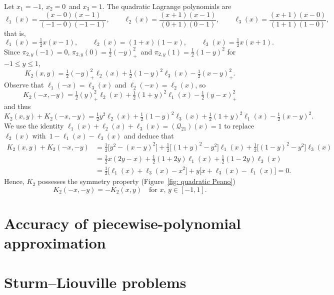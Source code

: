 \begin{example}\label{example: quadratic interp}
Let $x_1=-1$, $x_2=0$~and $x_3=1$.  The quadratic Lagrange polynomials are
\[
\ell_1(x)=\frac{(x-0)(x-1)}{(-1-0)(-1-1)},\qquad
\ell_2(x)=\frac{(x+1)(x-1)}{(0+1)(0-1)},\qquad
\ell_3(x)=\frac{(x+1)(x-0)}{(1+1)(1-0)},
\]
that is,
\[
\ell_1(x)=\tfrac12x(x-1),\qquad
\ell_2(x)=(1+x)(1-x),\qquad
\ell_3(x)=\tfrac12x(x+1).
\]
Since $\pi_{2,y}(-1)=0$, $\pi_{2,y}(0)=\tfrac12(-y)_+^2$~and 
$\pi_{2,y}(1)=\tfrac12(1-y)^2$ for~$-1\le y\le 1$,
\begin{equation}\label{eq: quadratic Peano}
K_2(x,y)=\tfrac12(-y)_+^2\ell_2(x)+\tfrac12(1-y)^2\ell_3(x)-\tfrac12(x-y)_+^2.
\end{equation}
Observe that $\ell_1(-x)=\ell_3(x)$ and $\ell_2(-x)=\ell_2(x)$, so
\[
K_2(-x,-y)=\tfrac12(y)_+^2\ell_2(x)+\tfrac12(1+y)^2\ell_1(x)-\tfrac12(y-x)_+^2
\]
and thus
\[
K_2(x,y)+K_2(-x,-y)=\tfrac12y^2\ell_2(x)+\tfrac12(1-y)^2\ell_3(x)
	+\tfrac12(1+y)^2\ell_1(x)-\tfrac12(x-y)^2.
\]
We use the identity $\ell_1(x)+\ell_2(x)+\ell_3(x)=(\mathcal{Q}_21)(x)=1$ to
replace $\ell_2(x)$ with~$1-\ell_1(x)-\ell_3(x)$ and deduce that
\begin{align*}
K_2(x,y)+K_2(-x,-y)&=\tfrac12\bigl[y^2-(x-y)^2\bigr]
	+\tfrac12\bigl[(1+y)^2-y^2\bigr]\ell_1(x)
	+\tfrac12\bigl[(1-y)^2-y^2\bigr]\ell_3(x)\\
	&=\tfrac12x(2y-x)+\tfrac12(1+2y)\ell_1(x)+\tfrac12(1-2y)\ell_3(x)\\
	&=\tfrac12\bigl[\ell_1(x)+\ell_3(x)-x^2\bigr]
	+y\bigl[x+\ell_3(x)-\ell_1(x)\bigr]=0.
\end{align*}
Hence, $K_2$ possesses the symmetry property (Figure~\ref{fig: quadratic Peano})
\begin{equation}\label{eq: K2 symmetry}
K_2(-x,-y)=-K_2(x,y)\quad\text{for $x$, $y\in[-1,1]$.}
\end{equation}
\end{example}

\section{Accuracy of piecewise-polynomial approximation}

\section{Sturm--Liouville problems}

